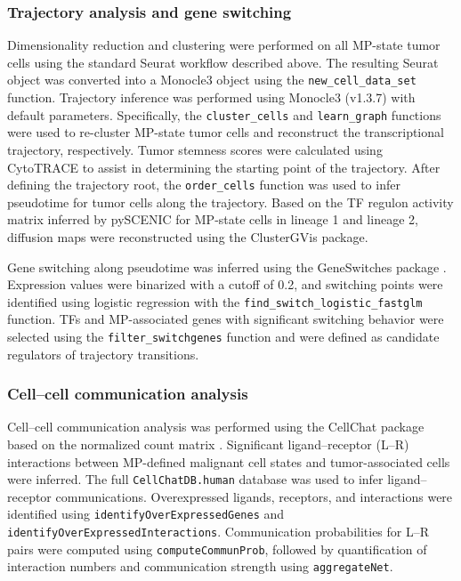 \documentclass[pdflatex,sn-mathphys-num]{sn-jnl}%
\theoremstyle{thmstyleone}%
\theoremstyle{thmstyletwo}%
\theoremstyle{thmstylethree}%
\begin{document}
\subsubsection{Trajectory analysis and gene switching}

Dimensionality reduction and clustering were performed on all MP-state tumor cells using the standard Seurat workflow described above. The resulting Seurat object was converted into a Monocle3 object using the \texttt{new\_cell\_data\_set} function. Trajectory inference was performed using Monocle3 (v1.3.7) \cite{bib37} with default parameters. Specifically, the \texttt{cluster\_cells} and \texttt{learn\_graph} functions were used to re-cluster MP-state tumor cells and reconstruct the transcriptional trajectory, respectively. Tumor stemness scores were calculated using CytoTRACE \cite{bib38} to assist in determining the starting point of the trajectory. After defining the trajectory root, the \texttt{order\_cells} function was used to infer pseudotime for tumor cells along the trajectory. Based on the TF regulon activity matrix inferred by pySCENIC for MP-state cells in lineage 1 and lineage 2, diffusion maps were reconstructed using the ClusterGVis package.

Gene switching along pseudotime was inferred using the GeneSwitches package \cite{bib39}. Expression values were binarized with a cutoff of 0.2, and switching points were identified using logistic regression with the \texttt{find\_switch\_logistic\_fastglm} function. TFs and MP-associated genes with significant switching behavior were selected using the \texttt{filter\_switchgenes} function and were defined as candidate regulators of trajectory transitions.

\subsubsection{Cell--cell communication analysis}

Cell--cell communication analysis was performed using the CellChat package based on the normalized count matrix \cite{bib40}. Significant ligand--receptor (L--R) interactions between MP-defined malignant cell states and tumor-associated cells were inferred. The full \texttt{CellChatDB.human} database was used to infer ligand--receptor communications. Overexpressed ligands, receptors, and interactions were identified using \texttt{identifyOverExpressedGenes} and \texttt{identifyOverExpressedInteractions}. Communication probabilities for L--R pairs were computed using \texttt{computeCommunProb}, followed by quantification of interaction numbers and communication strength using \texttt{aggregateNet}.
\end{document}
